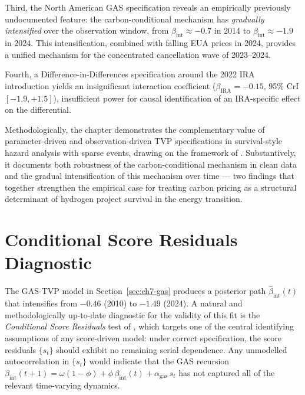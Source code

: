 \documentclass[11pt,a4paper]{article}
\newcommand{\bint}{\beta_{\mathrm{int}}}
\begin{document}
Third, the North American GAS specification reveals an empirically previously undocumented feature: the carbon-conditional mechanism has \textit{gradually intensified} over the observation window, from $\bint \approx -0.7$ in 2014 to $\bint \approx -1.9$ in 2024. This intensification, combined with falling EUA prices in 2024, provides a unified mechanism for the concentrated cancellation wave of 2023--2024.

Fourth, a Difference-in-Differences specification around the 2022 IRA introduction yields an insignificant interaction coefficient ($\beta_{\mathrm{IRA}} = -0.15$, 95\% CrI $[-1.9, +1.5]$), insufficient power for causal identification of an IRA-specific effect on the differential.

Methodologically, the chapter demonstrates the complementary value of parameter-driven and observation-driven TVP specifications in survival-style hazard analysis with sparse events, drawing on the framework of \citet{koopman2016predicting}. Substantively, it documents both robustness of the carbon-conditional mechanism in clean data and the gradual intensification of this mechanism over time --- two findings that together strengthen the empirical case for treating carbon pricing as a structural determinant of hydrogen project survival in the energy transition.



\section{Conditional Score Residuals Diagnostic}
\label{sec:ch7-csr}

The GAS-TVP model in Section~\ref{sec:ch7-gas} produces a posterior path $\hat\beta_{\mathrm{int}}(t)$ that intensifies from $-0.46$ (2010) to $-1.49$ (2024). A natural and methodologically up-to-date diagnostic for the validity of this fit is the \emph{Conditional Score Residuals} test of \citet{blasques2025conditional}, which targets one of the central identifying assumptions of any score-driven model: under correct specification, the score residuals $\{s_t\}$ should exhibit no remaining serial dependence. Any unmodelled autocorrelation in $\{s_t\}$ would indicate that the GAS recursion $\beta_{\mathrm{int}}(t+1) = \omega(1-\phi) + \phi\,\beta_{\mathrm{int}}(t) + \alpha_{\mathrm{gas}}\,s_t$ has not captured all of the relevant time-varying dynamics.
\end{document}
